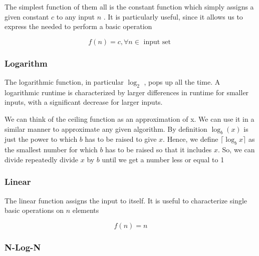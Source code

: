 	\par{The simplest function of them all is the constant function which simply
	assigns a given constant $c$ to any input $n$ . It is particularly useful,
	since it allows us to express the  needed to perform a basic
	operation}
	
	$$f(n) = c , \forall n \in \text{ input set }$$


\subsubsection{Logarithm}

	\par{The logarithmic function, in particular $\log_2$ , pops up all the
	time. A logarithmic runtime is characterized by larger differences in
	runtime for smaller inputs, with a significant decrease for larger inputs.}



	\par{We can think of the ceiling function as an approximation of x. We can
			use it in a similar manner to approximate any given algorithm. By
			definition $\log_b(x)$ is just the power to which $b$ has to be
			raised to give $x$. Hence, we define $\lceil\log_b x\rceil$ as the
	smallest number for which $b$ has to be raised so that it includes $x$. So,
	we can divide repeatedly divide $x$ by $b$ until we get a number less or
	equal to 1} 
	

\subsubsection{Linear}

	\par{The linear function assigns the input to itself. It is useful to
	characterize single basic operations on $n$ elements}

	$$f(n) = n$$

\subsubsection{N-Log-N}

